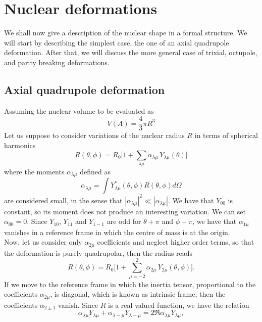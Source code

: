 \section{Nuclear deformations}
We shall now give a description of the nuclear shape in a formal structure. We will start by describing the simplest case, the one of an axial quadrupole deformation. After that, we will discuss the more general case of trixial, octupole, and parity breaking deformations.
\subsection{Axial quadrupole deformation}
Assuming the nuclear volume to be evaluated as
\begin{equation}
    V(A) = \frac{4}{3}\pi R^3
\end{equation}
Let us suppose to consider variations of the nuclear radius $R$ in terms of spherical harmonics
\begin{equation}
    R(\theta, \phi) = R_0\bigg[1+\sum_{\lambda \mu}\alpha_{\lambda \mu}\,Y_{\lambda\mu}(\theta)\bigg]
\end{equation}
where the moments $\alpha_{\lambda \mu}$ defined as
\begin{equation}
    \alpha_{\lambda \mu}=\int Y_{\lambda\mu}^*(\theta, \phi)R(\theta, \phi) d\Omega
\end{equation}
are considered small, in the sense that $|\alpha_{\lambda \mu}| ^2 \ll |\alpha_{\lambda \mu}| $. We have that $Y_{00}$ is constant, so its moment does not produce an interesting variation. We can set $\alpha_{00}=0$. 
Since $Y_{10}$, $Y_{11}$ and $Y_{1-1}$ are odd for $\theta + \pi$ and $\phi + \pi$, we have that $\alpha_{1\mu}$ vanishes in a reference frame in which the centre of mass is at the origin.
\\Now, let us consider only $\alpha_{2\mu}$ coefficients and neglect higher order terms, so that the deformation is purely quadrupolar, then the radius reads
\begin{equation}
    R(\theta, \phi) = R_0\bigg[1+\sum_{\mu=-2}^2\alpha_{2\mu}\,Y_{2\mu}(\theta, \phi)\bigg].
\end{equation}
If we move to the reference frame in which the inertia tensor, proportional to the coefficients $\alpha_{2\mu}$, is diagonal, which is known as intrinsic frame, then the coefficients $\alpha_{2\pm 1}$ vanish. Since $R$ is a real valued function, we have the relation
\begin{equation}
\alpha_{\lambda \mu}Y_{\lambda\mu}+\alpha_{\lambda -\mu}Y_{\lambda-\mu}=2\Re{\alpha_{\lambda \mu}Y_{\lambda\mu}},
\end{equation}
